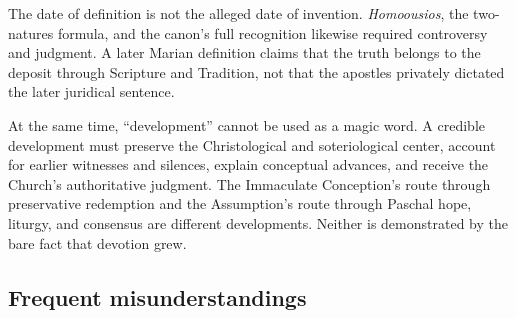 The date of definition is not the alleged date of invention. \emph{Homoousios}, the two-natures formula, and the canon's full recognition likewise required controversy and judgment. A later Marian definition claims that the truth belongs to the deposit through Scripture and Tradition, not that the apostles privately dictated the later juridical sentence.

At the same time, ``development'' cannot be used as a magic word. A credible development must preserve the Christological and soteriological center, account for earlier witnesses and silences, explain conceptual advances, and receive the Church's authoritative judgment. The Immaculate Conception's route through preservative redemption and the Assumption's route through Paschal hope, liturgy, and consensus are different developments. Neither is demonstrated by the bare fact that devotion grew.

\subsection{Frequent misunderstandings}

